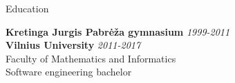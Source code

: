 \documentclass[]{resume} %
\begin{document}

\begin{rSection}{Education}

{\bf Kretinga Jurgis Pabrėža gymnasium} \hfill {\em 1999-2011} \\
{\bf Vilnius University} \hfill {\em 2011-2017} \\
Faculty of Mathematics and Informatics\\
Software engineering bachelor\\

\end{rSection}

\end{document}
